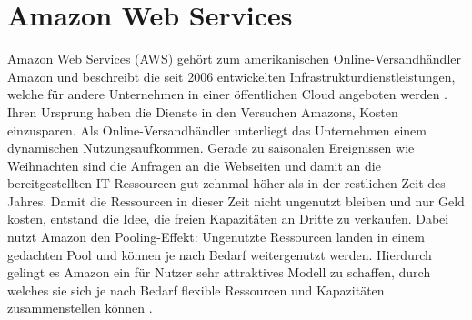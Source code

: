 \chapter{Amazon Web Services}
\label{chapter:awsgen} %
Amazon Web Services (AWS) gehört zum amerikanischen Online-Versandhändler Amazon und beschreibt die
seit 2006 entwickelten Infrastrukturdienstleistungen, welche für andere Unternehmen in einer öffentlichen Cloud angeboten
werden \cite{aws:general}. Ihren Ursprung haben die Dienste in den Versuchen Amazons, Kosten einzusparen. Als Online-Versandhändler unterliegt das Unternehmen einem dynamischen
Nutzungsaufkommen. Gerade zu saisonalen Ereignissen wie Weihnachten sind die Anfragen
an die Webseiten und damit an die bereitgestellten IT-Ressourcen gut zehnmal höher als
in der restlichen Zeit des Jahres. Damit die Ressourcen in dieser Zeit nicht ungenutzt
bleiben und nur Geld kosten, entstand die Idee, die freien Kapazitäten an Dritte zu verkaufen.
Dabei nutzt Amazon den Pooling-Effekt: Ungenutzte Ressourcen landen in einem gedachten Pool und
können je nach Bedarf weitergenutzt werden. Hierdurch gelingt es Amazon ein für Nutzer
sehr attraktives Modell zu schaffen, durch welches sie sich je nach Bedarf flexible
Ressourcen und Kapazitäten zusammenstellen können \cite{baun:cloudcomp}.


